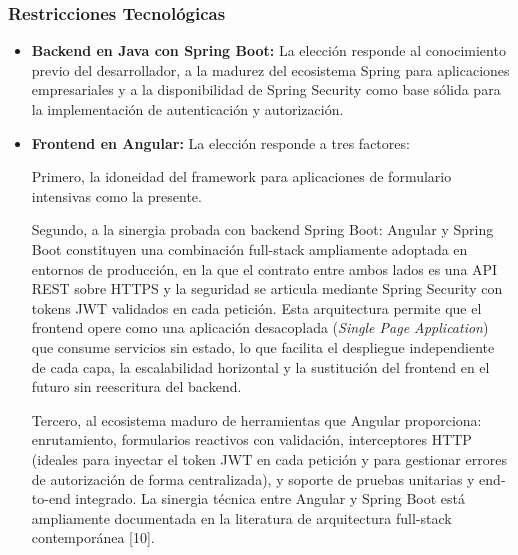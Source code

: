 \subsubsection{Restricciones Tecnológicas}
\begin{itemize}
    \item \textbf{Backend en Java con Spring Boot:} La elección responde al conocimiento
    previo del desarrollador, a la madurez del ecosistema Spring para
    aplicaciones empresariales y a la disponibilidad de Spring Security como
    base sólida para la implementación de autenticación y autorización.

    \item \textbf{Frontend en Angular:} La elección responde a tres factores:
    \par
    \vspace{5mm}
    Primero,
    la idoneidad del framework
    para aplicaciones de formulario intensivas como la presente.
    \par
    \vspace{5mm}
    Segundo, a la sinergia probada con backend Spring
    Boot: Angular y Spring Boot constituyen una combinación full-stack
    ampliamente adoptada en entornos de producción, en la que el contrato
    entre ambos lados es una API REST sobre HTTPS y la seguridad se articula
    mediante Spring Security con tokens JWT validados en cada petición. Esta
    arquitectura permite que el frontend opere como una aplicación
    desacoplada (\textit{Single Page Application}) que consume servicios sin estado,
    lo que facilita el despliegue independiente de cada capa, la
    escalabilidad horizontal y la sustitución del frontend en el futuro sin
    reescritura del backend. 
    \par
    \vspace{5mm}
    Tercero, al ecosistema maduro de
    herramientas que Angular proporciona: enrutamiento, formularios
    reactivos con validación, interceptores HTTP (ideales para inyectar el
    token JWT en cada petición y para gestionar errores de autorización de
    forma centralizada), y soporte de pruebas unitarias y end-to-end
    integrado. La sinergia técnica entre Angular y Spring Boot está
    ampliamente documentada en la literatura de arquitectura full-stack
    contemporánea [10].


\end{itemize}
